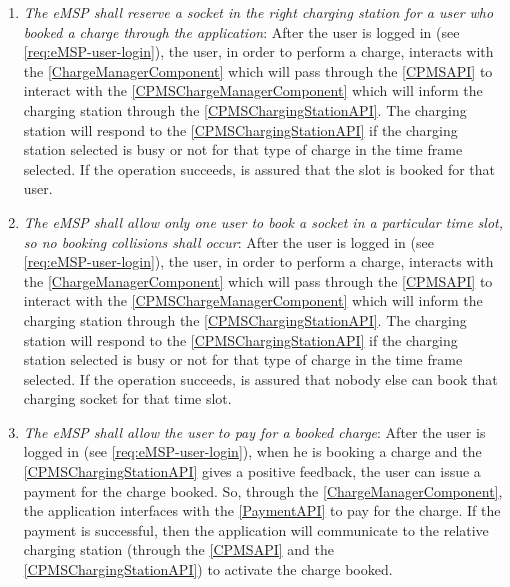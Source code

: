 \begin{enumerate}[label=\textbf{R\arabic*}]
    \label{req:eMSP-info-station}
    \item \textit{The \ac{eMSP} shall reserve a socket in the right charging station for a user who booked a charge through the application}:
    After the user is logged in (see \ref{req:eMSP-user-login}), the user, in order to perform a charge, interacts with the \ref{ChargeManagerComponent} which will pass through the \ref{CPMSAPI} to interact with the \ref{CPMSChargeManagerComponent} which will inform the charging station through the \ref{CPMSChargingStationAPI}. 
    The charging station will respond to the \ref{CPMSChargingStationAPI} if the charging station selected is busy or not for that type of charge in the time frame selected. If the operation succeeds, is assured that the slot is booked for that user.
    \label{req:eMSP-reserve-socket}
    \item \textit{The \ac{eMSP} shall allow only one user to book a socket in a particular time slot, so no booking collisions shall occur}:
    After the user is logged in (see \ref{req:eMSP-user-login}), the user, in order to perform a charge, interacts with the \ref{ChargeManagerComponent} which will pass through the \ref{CPMSAPI} to interact with the \ref{CPMSChargeManagerComponent} which will inform the charging station through the \ref{CPMSChargingStationAPI}. 
    The charging station will respond to the \ref{CPMSChargingStationAPI} if the charging station selected is busy or not for that type of charge in the time frame selected. If the operation succeeds, is assured that nobody else can book that charging socket for that time slot.
    \label{req:eMSP-no-book-collisions}
    \item \textit{The \ac{eMSP} shall allow the user to pay for a booked charge}:
    After the user is logged in (see \ref{req:eMSP-user-login}), when he is booking a charge and the \ref{CPMSChargingStationAPI} gives a positive feedback, the user can issue a payment for the charge booked. 
    So, through the \ref{ChargeManagerComponent}, the application interfaces with the \ref{PaymentAPI} to pay for the charge. If the payment is successful, then the application will communicate to the relative charging station (through the \ref{CPMSAPI} and the \ref{CPMSChargingStationAPI}) to activate the charge booked.

\end{enumerate}
